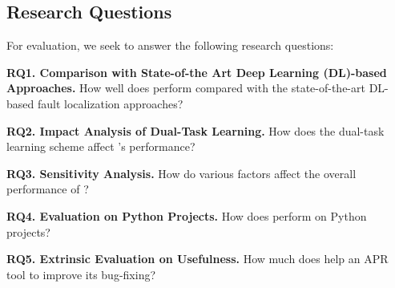 \subsection{Research Questions}

For evaluation, we seek to answer the following research questions:

\noindent\textbf{RQ1. Comparison with State-of-the Art Deep Learning
  (DL)-based Approaches.}  How well does {\tool} perform compared with
the state-of-the-art DL-based fault localization approaches?

\noindent\textbf{RQ2. Impact Analysis of Dual-Task Learning.} 
How does the dual-task learning scheme affect {\tool}'s performance?

\noindent\textbf{RQ3. Sensitivity Analysis.} How do various factors affect the overall performance of {\tool}?


\noindent\textbf{RQ4. Evaluation on Python Projects.} How does {\tool}
perform on Python projects?

\noindent\textbf{RQ5. Extrinsic Evaluation on Usefulness.} How much
does {\tool} help an APR tool to improve its bug-fixing?

